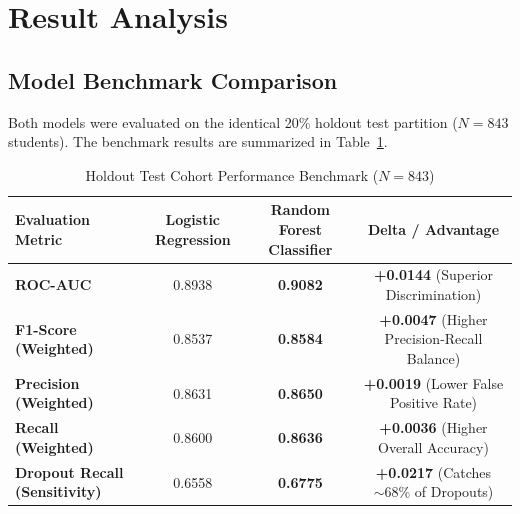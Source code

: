 \documentclass[11pt,a4paper]{article}
\begin{document}
\section{Result Analysis}
\label{sec:result_analysis}

\subsection{Model Benchmark Comparison}
Both models were evaluated on the identical 20\% holdout test partition ($N=843$ students). The benchmark results are summarized in Table~\ref{tab:benchmark_metrics}.

\begin{table}[H]
    \centering
    \caption{Holdout Test Cohort Performance Benchmark ($N=843$)}
    \label{tab:benchmark_metrics}
    \begin{tabular}{lccc}
        \toprule
        \textbf{Evaluation Metric} & \textbf{Logistic Regression} & \textbf{Random Forest Classifier} & \textbf{Delta / Advantage} \\
        \midrule
        \textbf{ROC-AUC} & 0.8938 & \textbf{0.9082} & \textbf{+0.0144} (Superior Discrimination) \\
        \textbf{F1-Score (Weighted)} & 0.8537 & \textbf{0.8584} & \textbf{+0.0047} (Higher Precision-Recall Balance) \\
        \textbf{Precision (Weighted)} & 0.8631 & \textbf{0.8650} & \textbf{+0.0019} (Lower False Positive Rate) \\
        \textbf{Recall (Weighted)} & 0.8600 & \textbf{0.8636} & \textbf{+0.0036} (Higher Overall Accuracy) \\
        \textbf{Dropout Recall (Sensitivity)} & 0.6558 & \textbf{0.6775} & \textbf{+0.0217} (Catches $\sim 68\%$ of Dropouts) \\
        \bottomrule
    \end{tabular}
\end{table}
\end{document}
